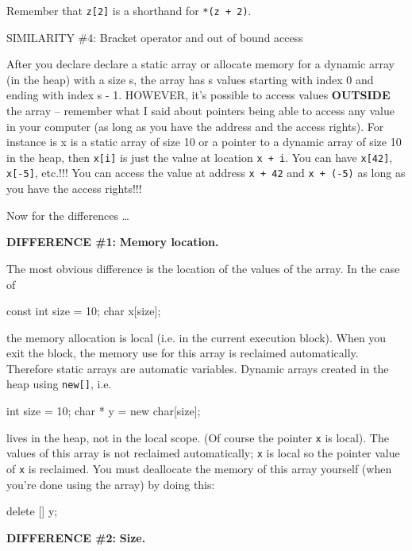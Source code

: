 Remember that \texttt{z[2]} is a shorthand for \texttt{*(z + 2)}.

SIMILARITY \#4: Bracket operator and out of bound access

After you declare declare a static array or allocate memory for a
dynamic array (in the heap) with a size s, the array has s values
starting with index 0 and ending with index s - 1. HOWEVER, it's
possible to access values \textbf{OUTSIDE} the array -- remember what I
said about pointers being able to access any value in your computer (as
long as you have the address and the access rights). For instance is x
is a static array of size 10 or a pointer to a dynamic array of size 10
in the heap, then \texttt{x[i]} is just the value at location \texttt{x
+ i}. You can have \texttt{x[42]}, \texttt{x[-5]}, etc.!!! You can
access the value at address \texttt{x + 42} and \texttt{x + (-5)} as long as
you have the access rights!!!

Now for the differences \ldots{}

\textbf{DIFFERENCE \#1:} \textbf{Memory location.}

The most obvious difference is the location of the values of the array.
In the case of

\begin{consolethree}[escapeinside=||]
const int size = 10;
char x[size];
\end{consolethree}

the memory allocation is local (i.e. in the current execution block).
When you exit the block, the memory use for this array is reclaimed
automatically. Therefore static arrays are automatic variables. Dynamic
arrays created in the heap using \texttt{new[]}, i.e.

\begin{consolethree}[escapeinside=||]
int size = 10;
char * y = new char[size];
\end{consolethree}

lives in the heap, not in the local scope. (Of course the pointer
\texttt{x} is local). The values of this array is not reclaimed
automatically; \texttt{x} is local so the pointer value of \texttt{x} is
reclaimed. You must deallocate the memory of this array yourself (when
you're done using the array) by doing this:

\begin{consolethree}[escapeinside=||]
delete [] y;
\end{consolethree}

\textbf{DIFFERENCE \#2:} \textbf{Size.}

